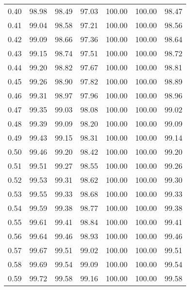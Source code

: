 \begin{tabular}{|c|c|c|c|c|c|c|}
      0.40 &     98.98 &     98.49 &      97.03 &  100.00 &     100.00 &         98.47 \\
      0.41 &     99.04 &     98.58 &      97.21 &  100.00 &     100.00 &         98.56 \\
      0.42 &     99.09 &     98.66 &      97.36 &  100.00 &     100.00 &         98.64 \\
      0.43 &     99.15 &     98.74 &      97.51 &  100.00 &     100.00 &         98.72 \\
      0.44 &     99.20 &     98.82 &      97.67 &  100.00 &     100.00 &         98.81 \\
      0.45 &     99.26 &     98.90 &      97.82 &  100.00 &     100.00 &         98.89 \\
      0.46 &     99.31 &     98.97 &      97.96 &  100.00 &     100.00 &         98.96 \\
      0.47 &     99.35 &     99.03 &      98.08 &  100.00 &     100.00 &         99.02 \\
      0.48 &     99.39 &     99.09 &      98.20 &  100.00 &     100.00 &         99.09 \\
      0.49 &     99.43 &     99.15 &      98.31 &  100.00 &     100.00 &         99.14 \\
      0.50 &     99.46 &     99.20 &      98.42 &  100.00 &     100.00 &         99.20 \\
      0.51 &     99.51 &     99.27 &      98.55 &  100.00 &     100.00 &         99.26 \\
      0.52 &     99.53 &     99.31 &      98.62 &  100.00 &     100.00 &         99.30 \\
      0.53 &     99.55 &     99.33 &      98.68 &  100.00 &     100.00 &         99.33 \\
      0.54 &     99.59 &     99.38 &      98.77 &  100.00 &     100.00 &         99.38 \\
      0.55 &     99.61 &     99.41 &      98.84 &  100.00 &     100.00 &         99.41 \\
      0.56 &     99.64 &     99.46 &      98.93 &  100.00 &     100.00 &         99.46 \\
      0.57 &     99.67 &     99.51 &      99.02 &  100.00 &     100.00 &         99.51 \\
      0.58 &     99.69 &     99.54 &      99.09 &  100.00 &     100.00 &         99.54 \\
      0.59 &     99.72 &     99.58 &      99.16 &  100.00 &     100.00 &         99.58 \\

\end{tabular}

